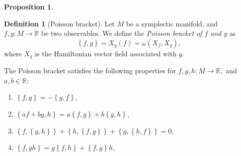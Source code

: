 \documentclass [xcolor=svgnames, t] {beamer}
\theoremstyle{definition}
\newtheorem{df}{Definition}
\theoremstyle{plain}
\newtheorem{prop}{Proposition}
\theoremstyle{remark}
\begin{document}
\begin{frame}
\begin{prop}
\end{prop}
\begin{df}[Poisson bracket]
	Let $ M $ be a symplectic manifold, and $ f,g: M \rightarrow \mathbb{R} $ be two observables. We define the \textit{Poisson bracket of $ f $ and $ g $} as 
	$$ \left\{ f,g \right\}= X_g(f)=\omega(X_f,X_g),$$ 
	where $ X_g  $ is the Hamiltonian vector field associated with $ g. $ 
\end{df}
	The Poisson bracket satisfies the following properties for $ f,g,h: M \rightarrow \mathbb{R},$ and $ a,b\in \mathbb{R} $:
	\begin{enumerate}
		\item $ \left\{ f,g \right\} = -\left\{ g,f \right\},$ 
		\item $ \left\{ af+bg,h \right\} = a\left\{ f,g \right\}+ b \left\{ g,h \right\} ,   $ 
		\item $ \left\{ f, \left\{ g,h \right\}  \right\} +\left\{ h, \left\{ f,g \right\}  \right\} + \left\{ g, \left\{ h,f \right\}  \right\} =0, $  
		\item $ \left\{ f,gh \right\} =g \left\{ f,h \right\} + \left\{ f,g \right\} h,$ 
	\end{enumerate}


\end{frame}
\end{document}

